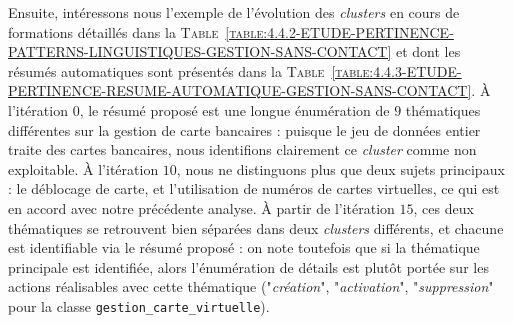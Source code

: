 			Ensuite, intéressons nous l'exemple de l'évolution des \textit{clusters} en cours de formations détaillés dans la \textsc{Table~\ref{table:4.4.2-ETUDE-PERTINENCE-PATTERNS-LINGUISTIQUES-GESTION-SANS-CONTACT}} et dont les résumés automatiques sont présentés dans la \textsc{Table~\ref{table:4.4.3-ETUDE-PERTINENCE-RESUME-AUTOMATIQUE-GESTION-SANS-CONTACT}}.
			À l'itération $0$, le résumé proposé est une longue énumération de $9$ thématiques différentes sur la gestion de carte bancaires : puisque le jeu de données entier traite des cartes bancaires, nous identifions clairement ce \textit{cluster} comme non exploitable.
			À l'itération $10$, nous ne distinguons plus que deux sujets principaux : le déblocage de carte, et l'utilisation de numéros de cartes virtuelles, ce qui est en accord avec notre précédente analyse.
			À partir de l'itération $15$, ces deux thématiques se retrouvent bien séparées dans deux \textit{clusters} différents, et chacune est identifiable via le résumé proposé : on note toutefois que si la thématique principale est identifiée, alors l'énumération de détails est plutôt portée sur les actions réalisables avec cette thématique ("\textit{création}", "\textit{activation}", "\textit{suppression}" pour la classe \texttt{gestion\_carte\_virtuelle}).
			
